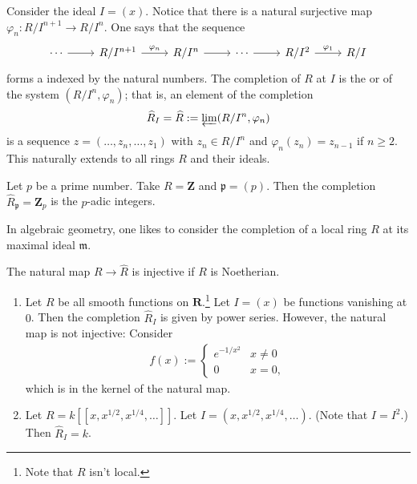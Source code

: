 \documentclass [11 pt, oneside, margin = 1 in] {article}
\begin{document}
Consider the ideal $I=(x)$. Notice that there is a natural surjective map $\varphi_n :R/I^{n+1} \longrightarrow R/I^{n}$. One says that the sequence
\[
\begin{tikzcd}
	\cdots\ar[r] &R/I^{n+1}\ar[r,"\varphi_n"]&R/I^n \ar[r] &\cdots\ar[r] &R/I^2 \ar[r,"\varphi_1"] &R/I 
\end{tikzcd}
\]
forms a  indexed by the natural numbers.
The completion of $R$ at $I$ is the  or  of the system $(R/I^n, \varphi_n)$; that is, an element of the completion
\begin{align*}
	\widehat{R}_I = \widehat{R} := \varprojlim (R/I^n, \varphi_n)
\end{align*}
is a sequence $z=(\hdots, z_n,\hdots,z_1)$ with $z_n\in R/I^n$ and $\varphi_n (z_n)=z_{n-1}$ if $n\ge 2$. This naturally extends to all rings $R$ and their ideals.

\begin{example}[ ]\label{}\text{}
Let $p$ be a prime number. Take $R=\mathbf{Z}$ and $\mathfrak{p}=(p)$. Then the completion $\widehat{R}_\mathfrak{p} = \mathbf{Z}_p$ is the $p$-adic integers.
\end{example}

In algebraic geometry, one likes to consider the completion of a local ring $R$ at its maximal ideal $\mathfrak{m}$.

The natural map $R\longrightarrow \widehat{R}$ is injective if $R$ is Noetherian.

\begin{example}\label{}\text{}
\begin{enumerate}
	\item Let $R$ be all smooth functions on $\mathbf{R}$.\footnote{Note that $R$ isn't local.} Let $I=(x)$ be functions vanishing at $0$. Then the completion $\widehat{R}_I$ is given by power series. However, the natural map is not injective: Consider
		\begin{align*}
			f(x):=
			 \begin{cases}
				 e^{-1/x^2}&x\ne 0\\
				 0&x=0,
			\end{cases}
		\end{align*}
		which is in the kernel of the natural map.
	\item Let $R = k [\![x,x^{1/2},x^{1/4},\hdots]\!]$. Let $I=(x,x^{1/2}, x^{1/4},\hdots)$. (Note that $I=I^2$.) Then $\widehat{R}_I = k$.
\end{enumerate}
\end{example}
\end{document}
